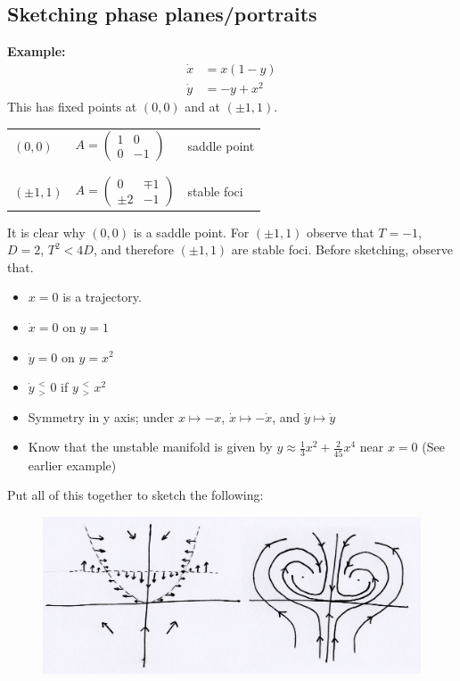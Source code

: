 \documentclass{article}
\newcommand{\example}{\textbf{Example:}}                    %
\begin{document}
\subsection{Sketching phase planes/portraits}
%
\example\
\\
\begin{align*}
\dot{x} &= x(1-y) \\
\dot{y} &= -y + x^2
\end{align*}
This has fixed points at $(0,0)$ and at $(\pm1,1)$. 
\begin{center}
\begin{tabular}{ m{2cm} m{3cm} m{3cm} }
$(0,0)$ & $A = \left( \begin{array}{cr} 1 & 0 \\ 0 & -1 \end{array} \right)$ & saddle point \\ \\ \\
$(\pm 1,1)$ & $A = \left( \begin{array}{cr} 0 & \mp 1 \\ \pm 2 & -1 \end{array} \right)$ & stable foci
\end{tabular}
\end{center}
It is clear why $(0,0)$ is a saddle point. For $(\pm1,1)$ observe that 
$T=-1$, $D=2$, $T^2 < 4D$, and therefore $(\pm 1, 1)$ are stable foci. Before
sketching, observe that.
\begin{itemize}
\item $x = 0$ is a trajectory.
\item $\dot{x}=0$ on $y=1$
\item $\dot{y} = 0$ on $y=x^2$
\item $\dot{y} \,\, ^{<}_{>} \,\, 0$ if $y \,\,^{<}_{>} \,\, x^2$
\item Symmetry in y axis; under $x \mapsto -x$, $\dot{x} \mapsto -\dot{x}$, and $\dot{y} \mapsto \dot{y}$
\item Know that the unstable manifold is given by $y \approx \frac{1}{3} x^2 + \frac{2}{45} x^4$
near $x=0$ (See earlier example)
\end{itemize}
Put all of this together to sketch the following:
\begin{figure}[H]
\centering
\includegraphics[scale=0.2]{fig20.png}
\end{figure}
\end{document}
